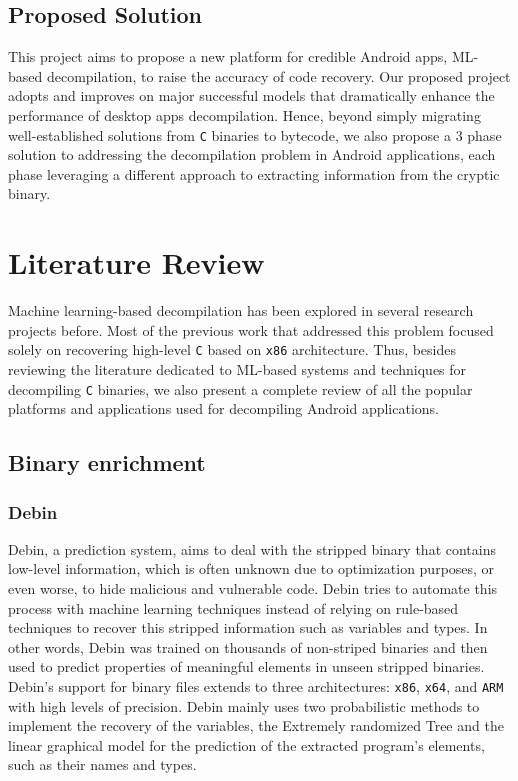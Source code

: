 \documentclass[conference,a4paper]{IEEEtran}
\begin{document}
\subsection{Proposed Solution}
This project aims to propose a new platform for credible Android apps, ML-based decompilation, to raise the accuracy of code recovery.
Our proposed project adopts and improves on major successful models that dramatically enhance the performance of desktop apps decompilation.
Hence, beyond simply migrating well-established solutions from \verb|C| binaries to bytecode, we also propose a 3 phase solution to addressing the decompilation problem in Android applications, each phase leveraging a different approach to extracting information from the cryptic binary.

\section{Literature Review}
Machine learning-based decompilation has been explored in several research projects before.
Most of the previous work that addressed this problem focused solely on recovering high-level \verb|C| based on \verb|x86| architecture.
Thus, besides reviewing the literature dedicated to ML-based systems and techniques for decompiling \verb|C| binaries, we also present a complete review of all the popular platforms and applications used for decompiling Android applications. 


\subsection{Binary enrichment}

\subsubsection{Debin}

Debin, a prediction system, aims to deal with the stripped binary that contains low-level information, which is often unknown due to optimization purposes, or even worse, to hide malicious and vulnerable code.
Debin tries to automate this process with machine learning techniques instead of relying on rule-based techniques to recover this stripped information such as variables and types. In other words, Debin was trained on thousands of non-striped binaries and then used to predict properties of meaningful elements in unseen stripped binaries.
Debin's support for binary files extends to three architectures: \verb|x86|, \verb|x64|, and \verb|ARM| with high levels of precision.
Debin mainly uses two probabilistic methods to implement the recovery of the variables, the Extremely randomized Tree and the linear graphical model for the prediction of the extracted program's elements, such as their names and types.
\end{document}
